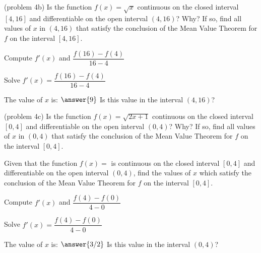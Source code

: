 \documentclass[handout]{ximera}
\begin{document}
\begin{problem}(problem 4b)
  Is the function $f(x) = \sqrt x$ continuous on the closed interval $[4,16]$ and differentiable on the open interval $(4,16)$? Why?
  If so, find all values of $x$ in $(4,16)$ that satisfy the conclusion of the Mean Value Theorem for $f$ on the interval $[4,16]$.
	
    \begin{hint}
      Compute $f'(x)$ and $\dfrac{f(16) - f(4)}{16-4}$
    \end{hint}
		\begin{hint}
		  Solve $f'(x) = \dfrac{f(16) - f(4)}{16-4}$
		\end{hint}
		
		The value of $x$ is:
		 $\answer{9}$
     Is this value in the interval $(4,16)$?
\end{problem}


\begin{problem}(problem 4c)
  Is the function $f(x) = \sqrt{2x+1}$ continuous on the closed interval $[0,4]$ and differentiable on the open interval $(0,4)$? Why?
  If so, find all values of $x$ in $(0,4)$ that satisfy the conclusion of the Mean Value Theorem for $f$ on the interval $[0,4]$.


  Given that the function $f(x) = $ is continuous on the closed interval $[0,4]$ and differentiable on the open interval $(0,4)$,
  find the values of $x$ which satisfy the conclusion of the Mean Value Theorem for $f$ on the interval $[0,4]$.
	
    \begin{hint}
      Compute $f'(x)$ and $\dfrac{f(4) - f(0)}{4-0}$
    \end{hint}
		\begin{hint}
		  Solve $f'(x) = \dfrac{f(4) - f(0)}{4-0}$
		\end{hint}
		
		The value of $x$ is:
		 $\answer{3/2}$
     Is this value in the interval $(0,4)$?
\end{problem}
\end{document}
